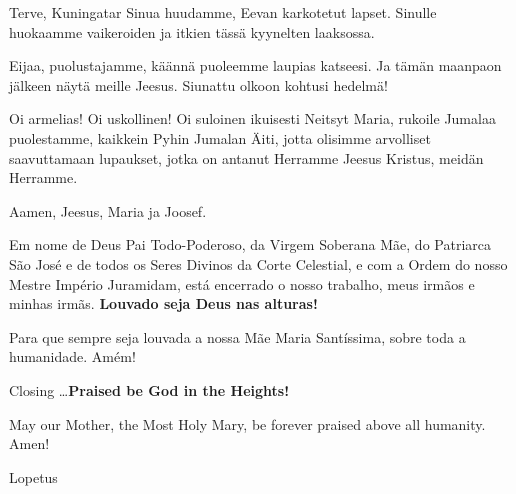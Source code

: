 \begin{songs}{}
\begin{passage}[FI]{Terve, Kuningatar}
          Sinua huudamme, Eevan karkotetut lapset. Sinulle huokaamme vaikeroiden ja
          itkien tässä kyynelten laaksossa.
          \par
          Eijaa, puolustajamme, käännä puoleemme laupias katseesi. Ja tämän
          maanpaon jälkeen näytä meille Jeesus. Siunattu olkoon kohtusi hedelmä!
          \par
          Oi armelias! Oi uskollinen! Oi suloinen ikuisesti Neitsyt Maria,
          rukoile Jumalaa puolestamme, kaikkein Pyhin Jumalan Äiti, jotta
          olisimme arvolliset saavuttamaan lupaukset, jotka on antanut
          Herramme Jeesus Kristus, meidän Herramme.
          \par
          Aamen, Jeesus, Maria ja Joosef.
        \end{passage}
      \endsong
        \begin{passage}[PT]{}\vspace{-1ex}%
          Em nome de Deus Pai Todo-Poderoso, da Virgem
          Soberana Mãe, do Patriarca São José e de todos
          os Seres Divinos da Corte Celestial, e com
          a Ordem do nosso Mestre Império Juramidam,
          está encerrado o nosso trabalho, meus irmãos
          e minhas irmãs.
          \textbf{Louvado seja Deus nas alturas!}
          \par
          Para que sempre seja louvada a nossa Mãe Maria
          Santíssima, sobre toda a humanidade. Amém!
        \end{passage}
        \begin{passage}[EN]{Closing}
          \ldots\textbf{Praised be God in the Heights!}
          \par
          May our Mother, the Most Holy Mary, be forever
          praised above all humanity. Amen!
        \end{passage}
        \begin{passage}[FI]{Lopetus}

\end{passage}
\end{songs}
